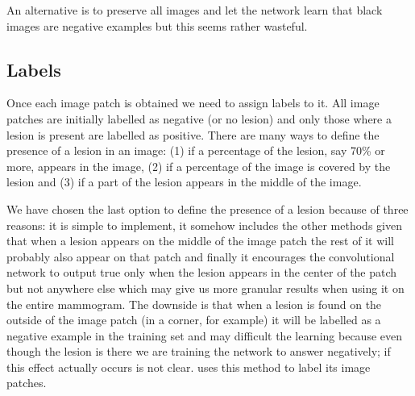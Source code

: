 An alternative is to preserve all images and let the network learn that black images are negative examples but this seems rather wasteful.


\subsection{Labels}
Once each image patch is obtained we need to assign labels to it. All image patches are initially labelled as negative (or no lesion) and only those where a lesion is present are labelled as positive. There are many ways to define the presence of a lesion in an image: (1) if a percentage of the lesion, say 70\% or more, appears in the image, (2) if a percentage of the image is covered by the lesion and (3) if a part of the lesion appears in the middle of the image.

We have chosen the last option to define the presence of a lesion because of three reasons: it is simple to implement, it somehow includes the other methods given that when a lesion appears on the middle of the image patch the rest of it will probably also appear on that patch and finally it encourages the convolutional network to output true only when the lesion appears in the center of the patch but not anywhere else which may give us more granular results when using it on the entire mammogram. The downside is that when a lesion is found on the outside of the image patch (in a corner, for example) it will be labelled as a negative example in the training set and may difficult the learning because even though the lesion is there we are training the network to answer negatively; if this effect actually occurs is not clear. \cite{Ciresan2013} uses this method to label its image patches.

